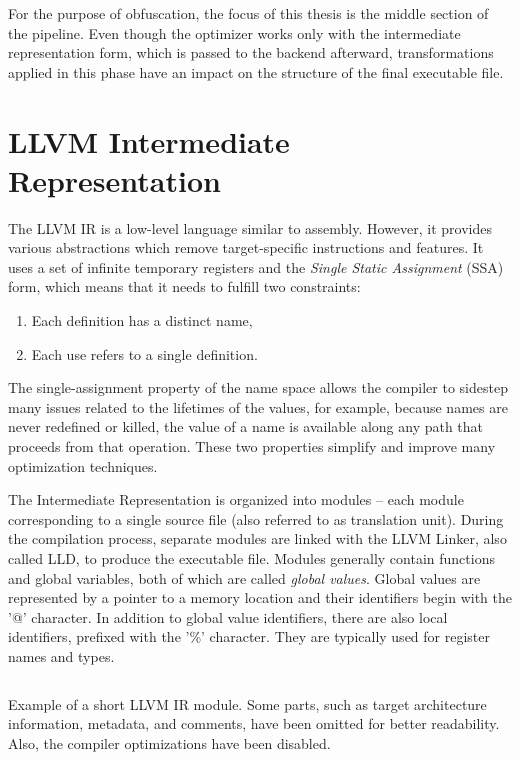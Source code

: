 \documentclass[
  digital, %
  notable,   %
  twoside, %
  nolof,     %
  nolot,     %
]{fithesis3}
\theoremstyle{definition}
\begin{document}
For the purpose of obfuscation, the focus of this thesis is the middle section of the pipeline. Even though the optimizer works only with the intermediate representation form, which is passed to the backend afterward, transformations applied in this phase have an impact on the structure of the final executable file. 

\section{LLVM Intermediate Representation} \label{sec:ir}
The LLVM IR is a low-level language similar to assembly. However, it provides various abstractions which remove target-specific instructions and features. It uses a set of infinite temporary registers and the \textit{Single Static Assignment} (SSA) form, which means that it needs to fulfill two constraints:

\begin{enumerate}
    \item Each definition has a distinct name,
    \item Each use refers to a single definition.
\end{enumerate}

 The  single-assignment  property  of  the  name  space  allows  the  compiler to sidestep many issues related to the lifetimes of the values, for example, because names are never redefined or killed, the value of a name is available along any path that proceeds from that operation. These two properties simplify and improve many optimization techniques\cite{eng_comp}.

The Intermediate Representation is organized into modules -- each module corresponding to a single source file (also referred to as translation unit). During the compilation process, separate modules are linked with the LLVM Linker, also called LLD, to produce the executable file. Modules generally contain functions and global variables, both of which are called \textit{global values}. Global values are represented by a pointer to a memory location and their identifiers begin with the '@' character. In addition to global value identifiers, there are also local identifiers, prefixed with the '\%' character. They are typically used for register names and types. 

\begin{listing}
    \inputminted{llvm}{example.ll}
    \caption{Example of a short LLVM IR module. Some parts, such as target architecture information, metadata, and comments, have been omitted for better readability. Also, the compiler optimizations have been disabled.}
    \label{fig:ir_example}
\end{listing}
\end{document}
